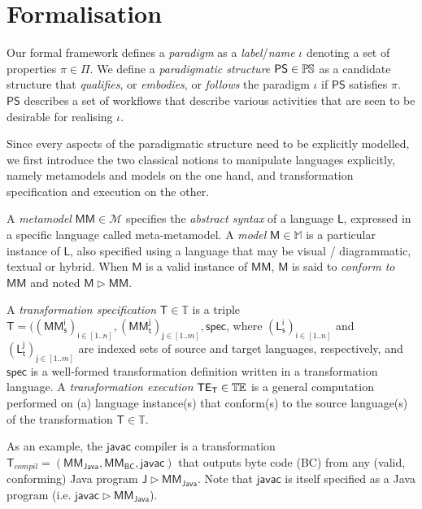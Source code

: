 \section{Formalisation}
\label{sec:Formalisation}

Our formal framework defines a \emph{paradigm} as a \emph{label}/\emph{name} 
$\iota$ denoting a set of properties $\pi\in\Pi$. We define a 
\emph{paradigmatic structure} $\mathsf{PS}\in \mathbb{P}\mskip-1mu\mathbb{S}$ as a candidate structure that 
\emph{qualifies}, or \emph{embodies}, or \emph{follows} the paradigm $\iota$ if 
$\mathsf{PS}$ satisfies $\pi$. $\mathsf{PS}$ describes a set of workflows that 
describe various activities that are seen to be desirable for realising 
$\iota$. 

Since every aspects of the paradigmatic structure need to be explicitly 
modelled, we first introduce the two classical notions to manipulate languages 
explicitly, namely metamodels and models on the one hand, and transformation 
specification and execution on the other. 

A \emph{metamodel} $\mathsf{MM} \in \mathcal{M}$ specifies the \emph{abstract 
syntax} of a language $\mathsf{L}$, expressed in a specific language called 
meta-metamodel. A \emph{model} $\mathsf{M} \in \mathbb{M}$ is a particular 
instance of $\mathsf{L}$, also specified using a language that may be visual / 
diagrammatic, textual or hybrid. When $\mathsf{M}$ is a valid instance of 
$\mathsf{MM}$, $\mathsf{M}$ is said to \emph{conform to} $\mathsf{MM}$ and noted 
$\mathsf{M} \rhd \mathsf{MM}$. 

A \emph{transformation specification} $\mathsf{T}\in\mathbb{T}$ is a triple 
$\mathsf{T} = ((\mathsf{MM_s^{i}})_{\mathsf{i}\in [1..n]}, 
(\mathsf{MM_t^{j}})_{\mathsf{j}\in[1..m]}, \mathsf{spec}$, where  
$(\mathsf{L_s^{i}})_{\mathsf{i}\in [1..n]}$ and
$(\mathsf{L_t^{j}})_{\mathsf{j}\in [1..m]}$ are indexed sets of source and
target languages, respectively, and $\mathsf{spec}$ is a well-formed 
transformation definition written in a transformation language. A 
\emph{transformation execution} $\mathsf{TE_{T}}\in\mathbb{T}\mskip-1mu\mathbb{E}$ is a general 
computation performed on (a) language instance(s) that conform(s) to the 
source language(s) of the transformation $\mathsf{T}\in\mathbb{T}$.

As an example, the $\mathsf{javac}$ compiler is a transformation 
$\mathsf{T}_{compil} = (\mathsf{MM_{Java}}, \mathsf{MM_{BC}}, \mathsf{javac})$
that outputs byte code (BC) from any (valid, conforming) Java program 
$\mathsf{J}  \rhd \mathsf{MM_{Java}}$. Note that $\mathsf{javac}$ is itself 
specified as a Java program (i.e. $\mathsf{javac} \rhd \mathsf{MM_{Java}}$).

